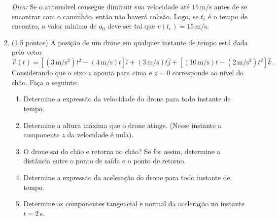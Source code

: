 \documentclass[fontsize=12pt]{scrartcl}
\newcommand{\un}[1]{\mathrm{#1}}
\begin{document}
\begin{enumerate}
  \textit{Dica:} Se o automóvel consegue diminuir sua velocidade até
  $15\,\un m/\un s$ antes de se encontrar com o caminhão, então não
  haverá colisão. Logo, se $t_e$ é o tempo de encontro, o valor mínimo
  de $a_0$ deve ser tal que $v(t_e)=15\,\un m/\un s$.
\item (1,5 pontos) A posição de um drone em qualquer instante de tempo
  está dada pelo vetor
  $$\vec r(t)=[(3\,\un m/\un{s}^2)t^2-(4\,\un m/\un s)t]\hat i+(3\,\un m/\un s)t\hat j+[(10\,\un m/\un s)t-(2\,\un m/\un{s}^2)t^2]\hat k\,.$$
  Considerando que o eixo $z$ aponta para cima e $z=0$ corresponde ao
  nível do chão. Faça o seguinte:
  \begin{enumerate}
  \item Determine a expressão da velocidade do drone para todo
    instante de tempo.
  \item Determine a altura máxima que o drone atinge. (Nesse instante
    a componente $z$ da velocidade é nula).
  \item O drone sai do chão e retorna ao chão? Se for assim, determine
    a distância entre o ponto de saída e o ponto de retorno.
  \item Determine a expressão da aceleração do drone para todo
    instante de tempo.
  \item Determine as componentes tangencial e normal da aceleração no
    instante $t=2\,\un s$.
  \end{enumerate}
\end{enumerate}
\end{document}
